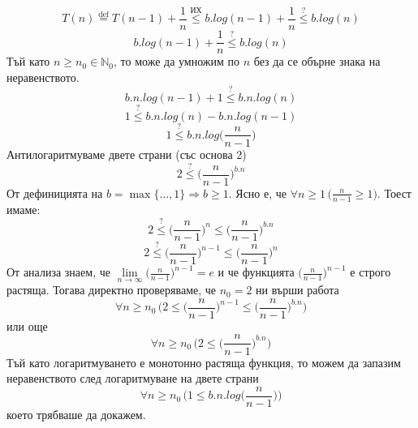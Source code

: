 \begin{solution}
\begin{itemize}
\begin{indstep}
			\begin{equation*}
				T(n)\overset{\text{def}}{=}T(n-1)+\frac1n\overset{\text{ИХ}}{\le}b.log(n-1)+\frac1n\overset{?}{\le}b.log(n)
			\end{equation*}
			\begin{equation*}
				b.log(n-1)+\frac1n\overset{?}{\le}b.log(n)
			\end{equation*}
			Тъй като $n\ge n_0\in\mathbb{N}_0$, то може да умножим по $n$ без да се обърне знака на неравенството.
			\begin{equation*}
				b.n.log(n-1)+1\overset{?}{\le}b.n.log(n)
			\end{equation*}
			\begin{equation*}
				1\overset{?}{\le}b.n.log(n)-b.n.log(n-1)
			\end{equation*}
			\begin{equation*}
				1\overset{?}{\le}b.n.log\bigg(\frac{n}{n-1}\bigg)
			\end{equation*}
			Антилогаритмуваме двете страни (със основа 2)
			\begin{equation*}
				2\overset{?}{\le}\bigg(\frac{n}{n-1}\bigg)^{b.n}
			\end{equation*}
			От дефиницията на $b=\max\{\dots,1\}\Rightarrow b\ge1$. Ясно е, че $\forall n\ge1\,\big(\frac{n}{n-1}\ge1\big)$. Тоест имаме:
			\begin{equation*}
				2\overset{?}{\le}\bigg(\frac{n}{n-1}\bigg)^n\le\bigg(\frac{n}{n-1}\bigg)^{b.n}
			\end{equation*}
			\begin{equation*}
				2\overset{?}{\le}\bigg(\frac{n}{n-1}\bigg)^{n-1}\le\bigg(\frac{n}{n-1}\bigg)^n
			\end{equation*}
			От анализа знаем, че $\lim\limits_{n\to\infty}\big(\frac{n}{n-1}\big)^{n-1}=e$ и че функцията $\big(\frac{n}{n-1}\big)^{n-1}$ е строго растяща. Тогава директно проверяваме, че $n_0=2$ ни върши работа%
			\begin{equation*}
				\forall n\ge n_0\,\Bigg(2\le\bigg(\frac{n}{n-1}\bigg)^{n-1}\le\bigg(\frac{n}{n-1}\bigg)^{b.n}\Bigg)
			\end{equation*}
			или още
			\begin{equation*}
				\forall n\ge n_0\,\Bigg(2\le\bigg(\frac{n}{n-1}\bigg)^{b.n}\Bigg)
			\end{equation*}
			Тъй като логаритмуването е монотонно растяща функция, то можем да запазим неравенството след логаритмуване на двете страни
			\begin{equation*}
				\forall n\ge n_0\,\Bigg(1\le b.n.log\bigg(\frac{n}{n-1}\bigg)\Bigg)
			\end{equation*}
			което трябваше да докажем.
		\end{indstep}
	

\end{itemize}
\end{solution}
